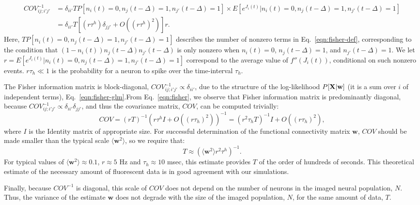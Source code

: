 \documentclass[aoas,preprint]{imsart}
\newcommand{\w}{w}
\newcommand{\bw}{\mathbf{\w}}
\newcommand{\bX}{{\bf X}}
\begin{document}
{\begin{align}
COV^{-1}_{ij;i'j'}
&=\delta_{ii'} T P[n_i(t)=0, n_j(t-\Delta)=1, n_{j'}(t-\Delta)=1]%
\times E[e^{J_i(t)}|n_i(t)=0, n_j(t-\Delta)=1, n_{j'}(t-\Delta)=1] \nonumber \\
&= \delta_{ii'}T\left[(r \tau^h)\delta_{jj'}+O((r \tau^h)^2)\right]r.
\end{align}
Here, $TP[n_i(t)=0, n_j(t-\Delta)=1, n_{j'}(t-\Delta)=1]$ describes the number of nonzero
terms in Eq.~\eqref{eqn:fisher-def}, corresponding to the condition that
$(1-n_i(t))n_{j}(t-\Delta)n_{j'}(t-\Delta)$ is only nonzero when
$n_i(t)=0$, $n_j(t-\Delta)=1$, and $n_{j'}(t-\Delta)=1$.  We let $r=E[e^{J_i(t)}|n_i(t)=0, n_j(t-\Delta)=1, n_{j'}(t-\Delta)=1]$  correspond to the average value of $f''(J_i(t))$, conditional on such nonzero events.  $r\tau_h \ll 1$ is the probability for a neuron to spike over the time-interval $\tau_h$.

The Fisher information matrix is block-diagonal, $COV^{-1}_{ij;i'j'} \propto \delta_{ii'}$, due to the structure of the log-likelihood $P[\bX | \bw]$ (it is a sum over $i$ of independent terms), Eq.~\eqref{eqn:fisher-glm}.From Eq.~\eqref{eqn:fisher}, we observe that Fisher information matrix is predominantly diagonal, because $COV^{-1}_{ij;i'j'} \propto \delta_{ii'}\delta_{jj'}$, and thus the covariance matrix, $COV$, can be computed trivially:
\begin{equation}
COV = (rT)^{-1} (r \tau^h I + O((r \tau_h)^2))^{-1} = (r^2 \tau_h T)^{-1} I + O((r \tau_h)^2),
\end{equation}
\noindent where $I$ is the Identity matrix of appropriate size.  For successful determination of the functional connectivity matrix $\bw$, $COV$ should be made smaller than the typical scale $\langle \bw^2\rangle$, so we require that:
\begin{equation}
T \approx (\langle \bw^2 \rangle r^2  \tau^h)^{-1}.
\end{equation}
For typical values of $\langle\bw^2\rangle\approx 0.1$, $r\approx 5$ Hz and $ \tau_h \approx 10$ msec, this estimate provides $T$ of the order of hundreds of seconds. This theoretical estimate of the necessary amount of fluorescent data is in good agreement with our simulations.

Finally, because $COV^{-1}$ is diagonal, this scale of $COV$ does not depend on the number of neurons in the imaged neural population, $N$. Thus, the variance of the estimate $\bw$ does not degrade with the size of the imaged population, $N$, for the same amount of data, $T$.

}
\end{document}
